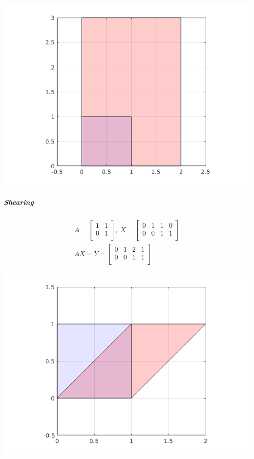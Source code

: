 \documentclass[MathsNotesBase.tex]{subfiles}
\begin{document}
{		\begin{center}
		\includegraphics[scale=0.85]{resources/img/GeometryOfMatrices_images/non_uniform_scaling.png}
		\end{center}
		
		\subparagraph{Shearing}
		\begin{align*}
		A =
		\begin{bmatrix}    
		1  &  1 \\
		0  &  1 \\		
		\end{bmatrix}
		,\; X = 
		\begin{bmatrix}  
		0   &  1  &   1  &   0 \\
		0   &  0  &   1  &   1	\\	
		\end{bmatrix} \\[10pt]
		AX = Y = 
		\begin{bmatrix}   
		0  &   1  &  2  &  1 \\
		0  &   0  &  1  &  1 \\
		\end{bmatrix}
		\end{align*}
	
		\begin{center}
		\includegraphics[scale=0.85]{resources/img/GeometryOfMatrices_images/shearing1.png}
		\end{center}
		
}
\end{document}
